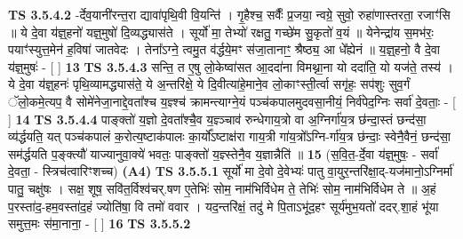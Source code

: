 \documentclass[17pt]{extarticle}
\begin{document}
                                \textbf{ TS 3.5.4.2} \newline
                  -र्देव॒यानी॑रन्त॒रा द्यावा॑पृथि॒वी वि॒यन्ति॑ । गृ॒हैश्च॒ सर्वैः᳚ प्र॒जया॒ न्वग्रे॒ सुवो॒ रुहा॑णास्तरता॒ रजाꣳ॑सि ॥ ये दे॒वा य॑ज्ञ्॒हनो॑ यज्ञ्॒मुषो॑ दि॒व्यद्ध्यास॑ते । सूर्यो॑ मा॒ तेभ्यो॑ रक्षतु॒ गच्छे॑म सु॒कृतो॑ व॒यं ॥ येनेन्द्रा॑य स॒मभ॑रः॒ पयाꣳ॑स्युत्त॒मेन॑ ह॒विषा॑ जातवेदः । तेना᳚ऽग्ने॒ त्वमु॒त व॑र्द्धये॒मꣳ स॑जा॒तानाꣳ॒॒ श्रैष्ठ्य॒ आ धे᳚ह्येनं ॥ य॒ज्ञ्॒हनो॒ वै दे॒वा य॑ज्ञ्॒मुषः॑ - [  ] \textbf{  13} \newline
                  \newline
                                \textbf{ TS 3.5.4.3} \newline
                  सन्ति॒ त ए॒षु लो॒केष्वा॑सत आ॒ददा॑ना विमथ्ना॒ना यो ददा॑ति॒ यो यज॑ते॒ तस्य॑ । ये दे॒वा य॑ज्ञ्॒हनः॑ पृथि॒व्यामद्ध्यास॑ते॒ ये अ॒न्तरि॑क्षे॒ ये दि॒वीत्या॑हे॒माने॒व लो॒काꣳस्ती॒र्त्वा सगृ॑हः॒ सप॑शुः सुव॒र्गं ॅलो॒कमे॒त्यप॒ वै सोमे॑नेजा॒नाद्दे॒वता᳚श्च य॒ज्ञ्श्च॑ क्रामन्त्याग्ने॒यं पञ्च॑कपालमुदवसा॒नीयं॒ निर्व॑पेद॒ग्निः सर्वा॑ दे॒वताः॒ - [  ] \textbf{  14} \newline
                  \newline
                                \textbf{ TS 3.5.4.4} \newline
                  पाङ्क्तो॑ य॒ज्ञो दे॒वता᳚श्चै॒व य॒ज्ञ्ञ्चाव॑ रुन्धेगाय॒त्रो वा अ॒ग्निर्गा॑य॒त्र छ॑न्दा॒स्तं छन्द॑सा॒ व्य॑र्द्धयति॒ यत् पञ्च॑कपालं क॒रोत्य॒ष्टाक॑पालः का॒र्यो᳚ऽष्टाक्ष॑रा गाय॒त्री गा॑य॒त्रो᳚ऽग्नि-र्गा॑य॒त्र छ॑न्दाः॒ स्वेनै॒वैनं॒ छन्द॑सा॒ सम॑र्द्धयति प॒ङ्क्त्यौ॑ याज्यानुवा॒क्ये॑ भवतः॒ पाङ्क्तो॑ य॒ज्ञ्स्तेनै॒व य॒ज्ञान्नैति॑ ॥ \textbf{  15 } \newline
                  \newline
                      (स॒वि॒त॒-र्दे॒वा य॑ज्ञ्॒मुषः॒ - सर्वा॑ दे॒वता॒ - स्त्रिच॑त्वारिꣳशच्च)  \textbf{(A4)} \newline \newline
                                        \textbf{ TS 3.5.5.1} \newline
                  सूर्यो॑ मा दे॒वो दे॒वेभ्यः॑ पातु वा॒युर॒न्तरि॑क्षा॒द्-यज॑मानो॒ऽग्निर्मा॑ पातु॒ चक्षु॑षः । सक्ष॒ शूष॒ सवि॑त॒र्विश्व॑चर्.षण ए॒तेभिः॑ सोम॒ नाम॑भिर्विधेम ते॒ तेभिः॑ सोम॒ नाम॑भिर्विधेम ते ॥ अ॒हं प॒रस्ता॑द॒-हम॒वस्ता॑द॒हं ज्योति॑षा॒ वि तमो॑ ववार । यद॒न्तरि॑क्षं॒ तदु॑ मे पि॒ताऽभू॑द॒हꣳ सूर्य॑मुभ॒यतो॑ ददर्.शा॒हं भू॑या समुत्त॒मः स॑मा॒नाना॒ - [  ] \textbf{  16} \newline
                  \newline
                                \textbf{ TS 3.5.5.2} \newline
\end{document}
